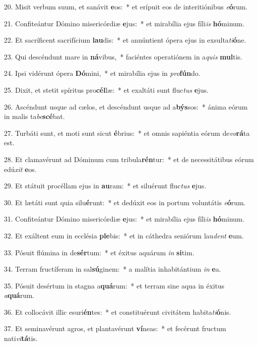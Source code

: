 20. Misit verbum suum, et sanávit \textbf{e}os:~*  et erípuit eos de interitiónibus \textit{e}\textbf{ó}rum.\

21. Confiteántur Dómino misericórdiæ \textbf{e}jus:~*  et mirabília ejus fíli\textit{is} \textbf{hó}minum.\

22. Et sacríficent sacrifícium \textbf{lau}dis:~*  et annúntient ópera ejus in exsulta\textit{ti}\textbf{ó}ne.\

23. Qui descéndunt mare in \textbf{ná}vibus,~*  faciéntes operatiónem in a\textit{quis} \textbf{mul}tis.\

24. Ipsi vidérunt ópera \textbf{Dó}mini,~*  et mirabília ejus in \textit{pro}\textbf{fún}do.\

25. Dixit, et stetit spíritus pro\textbf{cél}læ:~*  et exaltáti sunt fluc\textit{tus} \textbf{e}jus.\

26. Ascéndunt usque ad cælos, et descéndunt usque ad a\textbf{býs}sos:~*  ánima eórum in malis ta\textit{be}\textbf{scé}bat.\

27. Turbáti sunt, et moti sunt sicut \textbf{é}brius:~*  et omnis sapiéntia eórum de\textit{vo}\textbf{rá}ta est.\

28. Et clamavérunt ad Dóminum cum tribula\textbf{rén}tur:~*  et de necessitátibus eórum edú\textit{xit} \textbf{e}os.\

29. Et státuit procéllam ejus in \textbf{au}ram:~*  et siluérunt fluc\textit{tus} \textbf{e}jus.\

30. Et lætáti sunt quia silu\textbf{é}runt:~*  et dedúxit eos in portum voluntátis \textit{e}\textbf{ó}rum.\

31. Confiteántur Dómino misericórdiæ \textbf{e}jus:~*  et mirabília ejus fíli\textit{is} \textbf{hó}minum.\

32. Et exáltent eum in ecclésia \textbf{ple}bis:~*  et in cáthedra seniórum lau\textit{dent} \textbf{e}um.\

33. Pósuit flúmina in de\textbf{sér}tum:~*  et éxitus aquárum \textit{in} \textbf{si}tim.\

34. Terram fructíferam in sal\textbf{sú}ginem:~*  a malítia inhabitántium \textit{in} \textbf{e}a.\

35. Pósuit desértum in stagna a\textbf{quá}rum:~*  et terram sine aqua in éxitus \textit{a}\textbf{quá}rum.\

36. Et collocávit illic esuri\textbf{én}tes:~*  et constituérunt civitátem habita\textit{ti}\textbf{ó}nis.\

37. Et seminavérunt agros, et plantavérunt \textbf{ví}neas:~*  et fecérunt fructum nati\textit{vi}\textbf{tá}tis.\

